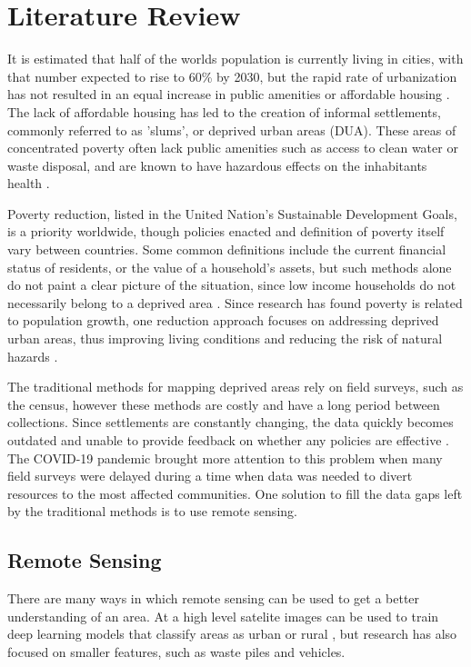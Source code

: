 \documentclass[conference]{IEEEtran}
\begin{document}
	\section{Literature Review}
		It is estimated that half of the worlds population is currently living in cities, with that number expected to rise to 60\% by 2030, but the rapid rate of urbanization has not resulted in an equal increase in public amenities or affordable housing \cite{UN_Sustanability_Report}.
		The lack of affordable housing has led to the creation of informal settlements, commonly referred to as 'slums', or deprived urban areas (DUA).
		These areas of concentrated poverty often lack public amenities such as access to clean water or waste disposal, and are known to have hazardous effects on the inhabitants health \cite{Georgano_Stefanos_2021}.
		
		Poverty reduction, listed in the United Nation's Sustainable Development Goals, is a priority worldwide, though policies enacted and definition of poverty itself vary between countries.
		Some common definitions include the current financial status of residents, or the value of a household's assets, but such methods alone do not paint a clear picture of the situation, since low income households do not necessarily belong to a deprived area \cite{Merodio_Paloma_2021}. 
		Since research has found poverty is related to population growth, one reduction approach focuses on addressing deprived urban areas, thus improving living conditions and reducing the risk of natural hazards \cite{Lin_Li_2021}.
		
		The traditional methods for mapping deprived areas rely on field surveys, such as the census, however these methods are costly and have a long period between collections.
		Since settlements are constantly changing, the data quickly becomes outdated and unable to provide feedback on whether any policies are effective \cite{Williams_Trecia_2020}.
		The COVID-19 pandemic brought more attention to this problem when many field surveys were delayed during a time when data was needed to divert resources to the most affected communities.
		One solution to fill the data gaps left by the traditional methods is to use remote sensing.
		
	\subsection{Remote Sensing}
		There are many ways in which remote sensing can be used to get a better understanding of an area.
		At a high level satelite images can be used to train deep learning models that classify areas as urban or rural \cite{Guo_Jinxin_2019}, but research has also focused on smaller features, such as waste piles and vehicles.
		
\end{document}
